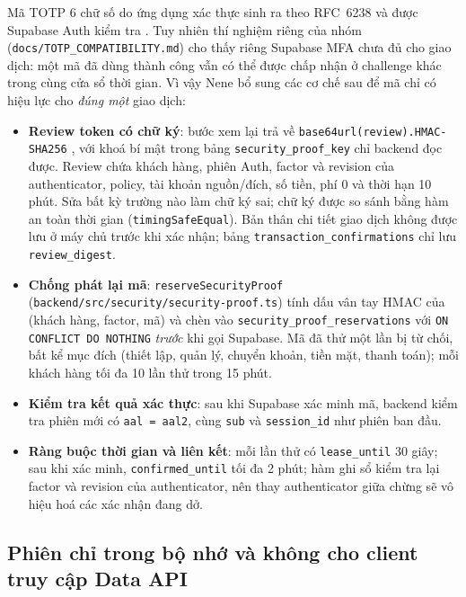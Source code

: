 Mã TOTP 6 chữ số do ứng dụng xác thực sinh ra theo RFC~6238 và được Supabase Auth kiểm tra \parencite{ch2-rfc6238,ch2-supabase-mfa}. Tuy nhiên thí nghiệm riêng của nhóm (\texttt{docs/\allowbreak{}TOTP\_\allowbreak{}COMPATIBILITY.\allowbreak{}md}) cho thấy riêng Supabase MFA chưa đủ cho giao dịch: một mã đã dùng thành công vẫn có thể được chấp nhận ở challenge khác trong cùng cửa sổ thời gian. Vì vậy Nene bổ sung các cơ chế sau để mã chỉ có hiệu lực cho \emph{đúng một} giao dịch:
\begin{itemize}
  \item \textbf{Review token có chữ ký}: bước xem lại trả về \texttt{base64url(review).\allowbreak{}HMAC-\allowbreak{}SHA256} \parencite{ch2-rfc2104}, với khoá bí mật trong bảng \texttt{security\_\allowbreak{}proof\_\allowbreak{}key} chỉ backend đọc được. Review chứa khách hàng, phiên Auth, factor và revision của authenticator, policy, tài khoản nguồn/đích, số tiền, phí 0 và thời hạn 10 phút. Sửa bất kỳ trường nào làm chữ ký sai; chữ ký được so sánh bằng hàm an toàn thời gian (\texttt{timing\allowbreak{}Safe\allowbreak{}Equal}). Bản thân chi tiết giao dịch không được lưu ở máy chủ trước khi xác nhận; bảng \texttt{transaction\_\allowbreak{}confirmations} chỉ lưu \texttt{review\_\allowbreak{}digest}.
  \item \textbf{Chống phát lại mã}: \texttt{reserve\allowbreak{}Security\allowbreak{}Proof} (\texttt{backend/\allowbreak{}src/\allowbreak{}security/\allowbreak{}security-\allowbreak{}proof.\allowbreak{}ts}) tính dấu vân tay HMAC của (khách hàng, factor, mã) và chèn vào \texttt{security\_\allowbreak{}proof\_\allowbreak{}reservations} với \texttt{ON CONFLICT DO NOTHING} \emph{trước} khi gọi Supabase. Mã đã thử một lần bị từ chối, bất kể mục đích (thiết lập, quản lý, chuyển khoản, tiền mặt, thanh toán); mỗi khách hàng tối đa 10 lần thử trong 15 phút.
  \item \textbf{Kiểm tra kết quả xác thực}: sau khi Supabase xác minh mã, backend kiểm tra phiên mới có \texttt{aal = aal2}, cùng \texttt{sub} và \texttt{session\_\allowbreak{}id} như phiên ban đầu.
  \item \textbf{Ràng buộc thời gian và liên kết}: mỗi lần thử có \texttt{lease\_\allowbreak{}until} 30 giây; sau khi xác minh, \texttt{confirmed\_\allowbreak{}until} tối đa 2 phút; hàm ghi sổ kiểm tra lại factor và revision của authenticator, nên thay authenticator giữa chừng sẽ vô hiệu hoá các xác nhận đang dở.
\end{itemize}

\subsection{Phiên chỉ trong bộ nhớ và không cho client truy cập Data API}
\label{sec:ch2-session}

